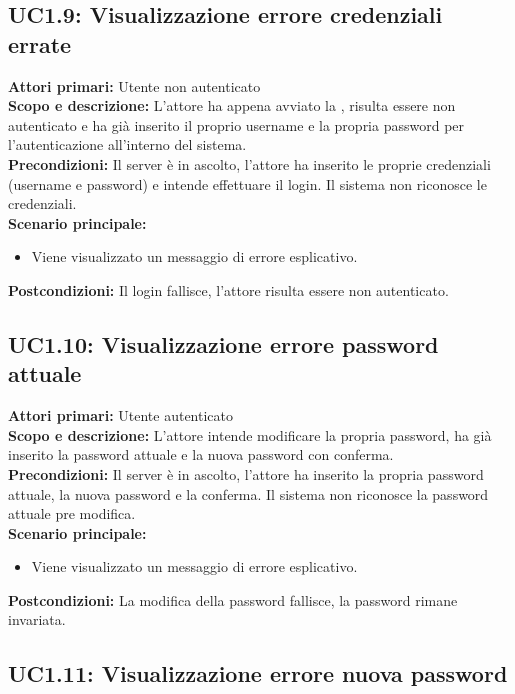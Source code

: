 \documentclass{scalatekids-article}
\begin{document}
\subsection{UC1.9: Visualizzazione errore credenziali errate}

\textbf{Attori primari:} Utente non autenticato\\
\textbf{Scopo e descrizione:}
L'attore ha appena avviato la , risulta essere non autenticato e ha già inserito il proprio username e la propria password per l'autenticazione all'interno del sistema.\\
\textbf{Precondizioni:} Il server è in ascolto, l'attore ha inserito le proprie credenziali (username e password) e intende effettuare il login. Il sistema non riconosce le credenziali.\\
\textbf{Scenario principale:}
\begin{itemize}
\item Viene visualizzato un messaggio di errore esplicativo.
\end{itemize}
\textbf{Postcondizioni:} Il login fallisce, l'attore risulta essere non autenticato.

\subsection{UC1.10: Visualizzazione errore password attuale}

\textbf{Attori primari:} Utente autenticato\\
\textbf{Scopo e descrizione:} L'attore intende modificare la propria password, ha già inserito la password attuale e la nuova password con conferma.\\
\textbf{Precondizioni:} Il server è in ascolto, l'attore ha inserito la propria password attuale, la nuova password e la conferma. Il sistema non riconosce la password attuale pre modifica.\\
\textbf{Scenario principale:}
\begin{itemize}
\item Viene visualizzato un messaggio di errore esplicativo.
\end{itemize}
\textbf{Postcondizioni:} La modifica della password fallisce, la password rimane invariata.

\subsection{UC1.11: Visualizzazione errore nuova password}
\end{document}

